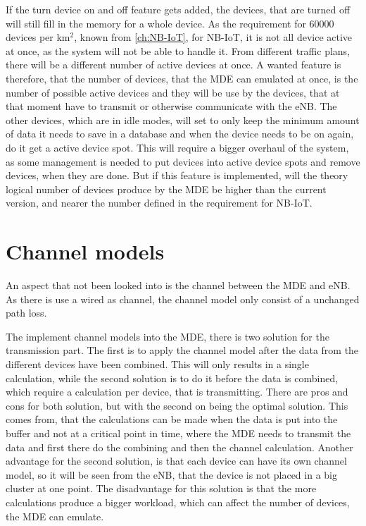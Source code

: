 If the turn device on and off feature gets added, the devices, that are turned off will still fill in the memory for a whole device. As the requirement for 60000 devices per km$^2$, known from \autoref{ch:NB-IoT}, for NB-IoT, it is not all device active at once, as the system will not be able to handle it. From different traffic plans, there will be a different number of active devices at once. A wanted feature is therefore, that the number of devices, that the MDE can emulated at once, is the number of possible active devices and they will be use by the devices, that at that moment have to transmit or otherwise communicate with the eNB. The other devices, which are in idle modes, will set to only keep the minimum amount of data it needs to save in a database and when the device needs to be on again, do it get a active device spot. This will require a bigger overhaul of the system, as some management is needed to put devices into active device spots and remove devices, when they are done. But if this feature is implemented, will the theory logical number of devices produce by the MDE be higher than the current version, and nearer the number defined in the requirement for NB-IoT.

\section{Channel models}
An aspect that not been looked into is the channel between the MDE and eNB. As there is use a wired as channel, the channel model only consist of a unchanged path loss. 

The implement channel models into the MDE, there is two solution for the transmission part. The first is to apply the channel model after the data from the different devices have been combined. This will only results in a single calculation, while the second solution is to do it before the data is combined, which require a calculation per device, that is transmitting. There are pros and cons for both solution, but with the second on being the optimal solution. This comes from, that the calculations can be made when the data is put into the buffer and not at a critical point in time, where the MDE needs to transmit the data and first there do the combining and then the channel calculation. Another advantage for the second solution, is that each device can have its own channel model, so it will be seen from the eNB, that the device is not placed in a big cluster at one point. The disadvantage for this solution is that the more calculations produce a bigger workload, which can affect the number of devices, the MDE can emulate.

